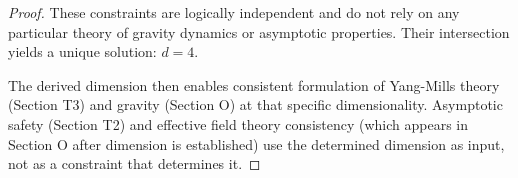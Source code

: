\begin{lemma}
\begin{proof}
These constraints are logically independent and do not rely on any particular theory of gravity dynamics or asymptotic properties. Their intersection yields a unique solution: $d = 4$.

The derived dimension then enables consistent formulation of Yang-Mills theory (Section T3) and gravity (Section O) at that specific dimensionality. Asymptotic safety (Section T2) and effective field theory consistency (which appears in Section O after dimension is established) use the determined dimension as input, not as a constraint that determines it.

\end{proof}

\end{lemma}
